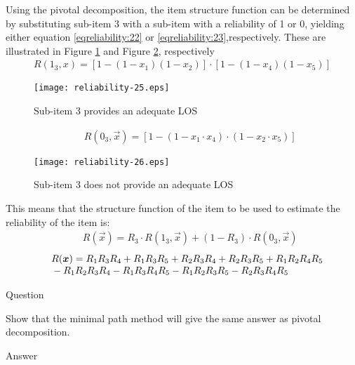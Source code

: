 Using the pivotal decomposition, the item structure function can be determined
by substituting sub-item 3 with a sub-item with a reliability of 1 or 0, yielding
either equation \eqref{eqreliability:22} or \eqref{eqreliability:23},respectively. These are illustrated in Figure \ref{reliability-25} and Figure \ref{reliability-26}, respectively
\begin{eqnarray}
R({1_3},x) = \left[ {1 - (1 - {x_1})(1 - {x_2})} \right] \cdot \left[ {1 - (1 -
{x_4})(1 - {x_5})} \right]
\label{eqreliability:22}
\end{eqnarray}
%
\begin{figure}[h]
\texttt{[image: reliability-25.eps]}
\caption{Sub-item 3 provides an adequate LOS}\label{reliability-25}
\end{figure}
%
\begin{eqnarray}
&& R({0_3},\vec x) = \left[ {1 - (1 - {x_1} \cdot {x_4})} \cdot (1 - {x_2} \cdot {x_5}) \right]
\label{eqreliability:23}
\end{eqnarray}
\begin{figure}[h]
\texttt{[image: reliability-26.eps]}
\caption{Sub-item 3 does not provide an adequate LOS}\label{reliability-26}
\end{figure}
This means that the structure function of the item to be used to estimate the
reliability of the item is:
\begin{eqnarray}
&& R(\vec x) = {R_3} \cdot R({1_3},\vec x) + (1 - {R_3}) \cdot R({0_3},\vec x)
\label{eqreliability:24}
\end{eqnarray}
\begin{eqnarray}
&& \begin{array}{l}
R(\vec x) = {R_1}{R_3}{R_4} + {R_1}{R_3}{R_5} + {R_2}{R_3}{R_4} +
{R_2}{R_3}{R_5} + {R_1}{R_2}{R_4}{R_5}\\
{\rm{          }} - {R_1}{R_2}{R_3}{R_4} - {R_1}{R_3}{R_4}{R_5} -
{R_1}{R_2}{R_3}{R_5} - {R_2}{R_3}{R_4}{R_5}
\end{array}
\label{eqreliability:25}
\end{eqnarray}

Question

Show that the minimal path method will give the same answer as pivotal
decomposition.

Answer


